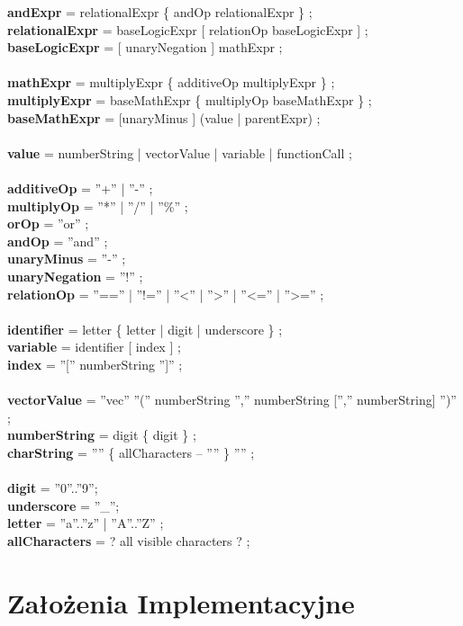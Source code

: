 \documentclass[11pt]{article} %
\begin{document}
\textbf{andExpr} = relationalExpr \{ andOp relationalExpr \} ;\\
\textbf{relationalExpr} = baseLogicExpr [ relationOp baseLogicExpr ] ;\\
\textbf{baseLogicExpr} = [ unaryNegation ] mathExpr ;\\
\\
\textbf{mathExpr} = multiplyExpr \{ additiveOp multiplyExpr \} ;\\
\textbf{multiplyExpr} = baseMathExpr \{ multiplyOp baseMathExpr \} ;\\
\textbf{baseMathExpr} = [unaryMinus ] (value | parentExpr) ;\\
\\
\textbf{value} = numberString | vectorValue | variable | functionCall ;\\
\\
\textbf{additiveOp} = ''+'' | ''-­'' ;\\
\textbf{multiplyOp} = ''*'' | ''/'' | ''\%'' ;\\
\textbf{orOp} = ''or'' ;\\
\textbf{andOp} = ''and'' ;\\
\textbf{unaryMinus} = ''-'' ;\\
\textbf{unaryNegation} = ''!'' ;\\
\textbf{relationOp} = ''=='' | ''!='' | ''<'' | ''>'' | ''<='' | ''>='' ;\\
\\
\textbf{identifier} = letter \{ letter | digit | underscore \} ;\\
\textbf{variable} = identifier [ index ] ;\\
\textbf{index} = ''['' numberString '']'' ;\\
\\
\textbf{vectorValue} = ''vec'' ''('' numberString '','' numberString ['','' numberString] '')'' ;\\ 
\textbf{numberString} = digit \{ digit \} ;\\
\textbf{charString} = '''' \{ allCharacters – '''' \} '''' ;\\
\\
\textbf{digit} = ''0''..''9'';\\
\textbf{underscore} = ''\_'';\\
\textbf{letter} = ''a''..''z'' | ''A''..''Z'' ;\\
\textbf{allCharacters} = ? all visible characters ? ;\\

\section{Założenia Implementacyjne}
\end{document}
